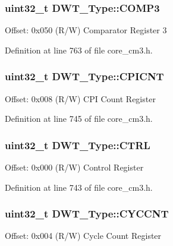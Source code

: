 \subsubsection[{\texorpdfstring{C\+O\+M\+P3}{COMP3}}]{ uint32\+\_\+t D\+W\+T\+\_\+\+Type\+::\+C\+O\+M\+P3}\hypertarget{structDWT__Type_a3df15697eec279dbbb4b4e9d9ae8b62f}{}\label{structDWT__Type_a3df15697eec279dbbb4b4e9d9ae8b62f}
Offset\+: 0x050 (R/W) Comparator Register 3 

Definition at line 763 of file core\+\_\+cm3.\+h.

\subsubsection[{\texorpdfstring{C\+P\+I\+C\+NT}{CPICNT}}]{ uint32\+\_\+t D\+W\+T\+\_\+\+Type\+::\+C\+P\+I\+C\+NT}\hypertarget{structDWT__Type_a88cca2ab8eb1b5b507817656ceed89fc}{}\label{structDWT__Type_a88cca2ab8eb1b5b507817656ceed89fc}
Offset\+: 0x008 (R/W) C\+PI Count Register 

Definition at line 745 of file core\+\_\+cm3.\+h.

\subsubsection[{\texorpdfstring{C\+T\+RL}{CTRL}}]{ uint32\+\_\+t D\+W\+T\+\_\+\+Type\+::\+C\+T\+RL}\hypertarget{structDWT__Type_a37964d64a58551b69ce4c8097210d37d}{}\label{structDWT__Type_a37964d64a58551b69ce4c8097210d37d}
Offset\+: 0x000 (R/W) Control Register 

Definition at line 743 of file core\+\_\+cm3.\+h.

\subsubsection[{\texorpdfstring{C\+Y\+C\+C\+NT}{CYCCNT}}]{ uint32\+\_\+t D\+W\+T\+\_\+\+Type\+::\+C\+Y\+C\+C\+NT}\hypertarget{structDWT__Type_a71680298e85e96e57002f87e7ab78fd4}{}\label{structDWT__Type_a71680298e85e96e57002f87e7ab78fd4}
Offset\+: 0x004 (R/W) Cycle Count Register 

